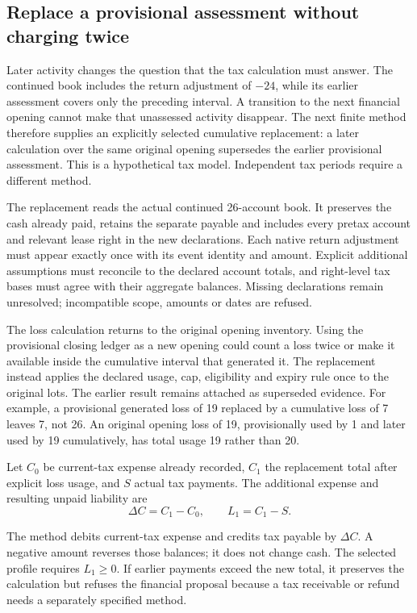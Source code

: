 
\subsection{Replace a provisional assessment without charging twice}

Later activity changes the question that the tax calculation must answer.
The continued book includes the return adjustment of $-24$, while its earlier
assessment covers only the preceding interval. A transition to the next
financial opening cannot make that unassessed activity disappear. The next
finite method therefore supplies an explicitly selected cumulative replacement:
a later calculation over the same original opening supersedes the earlier
provisional assessment. This is a hypothetical tax model. Independent tax
periods require a different method.

The replacement reads the actual continued 26-account book. It preserves the
cash already paid, retains the separate payable and includes every pretax
account and relevant lease right in the new declarations. Each native return
adjustment must appear exactly once with its event identity and amount.
Explicit additional assumptions must reconcile to the declared account totals,
and right-level tax bases must agree with their aggregate balances. Missing
declarations remain unresolved; incompatible scope, amounts or dates are refused.

The loss calculation returns to the original opening inventory. Using the
provisional closing ledger as a new opening could count a loss twice or make
it available inside the cumulative interval that generated it. The replacement
instead applies the declared usage, cap, eligibility and expiry rule once to
the original lots. The earlier result remains attached as superseded evidence.
For example, a provisional generated loss of 19 replaced by a cumulative loss
of 7 leaves 7, not 26. An original opening loss of 19, provisionally used by 1
and later used by 19 cumulatively, has total usage 19 rather than 20.

\begin{samepage}
Let $C_0$ be current-tax expense already recorded, $C_1$ the replacement total
after explicit loss usage, and $S$ actual tax payments. The additional expense
and resulting unpaid liability are
\[
 \Delta C=C_1-C_0,\qquad L_1=C_1-S.
\]
\end{samepage}
The method debits current-tax expense and credits tax payable by $\Delta C$.
A negative amount reverses those balances; it does not change cash. The
selected profile requires $L_1\geq0$. If earlier payments exceed the new total,
it preserves the calculation but refuses the financial proposal because a
tax receivable or refund needs a separately specified method.

